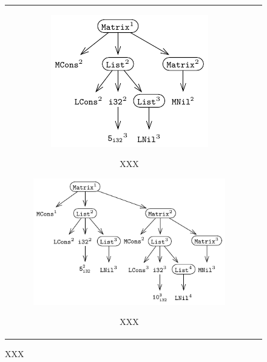 \begin{figure}[htpb]
\begin{tabular}{cc}
\begin{subfigure}[b]{0.40\textwidth}
\begin{center}
{\includegraphics[scale=1]{figParseTreeMatrix1.pdf}}
\vspace{20pt}
\end{center}
\caption{\label{fig:XXX}XXX}
\end{subfigure}%
\begin{subfigure}[b]{0.60\textwidth}
\begin{center}
{\includegraphics[scale=1]{figParseTreeMatrix2.pdf}}
\end{center}
\caption{\label{fig:XXX}XXX}
\end{subfigure}%
\end{tabular}
\caption{\label{fig:XXX}XXX}
\end{figure}